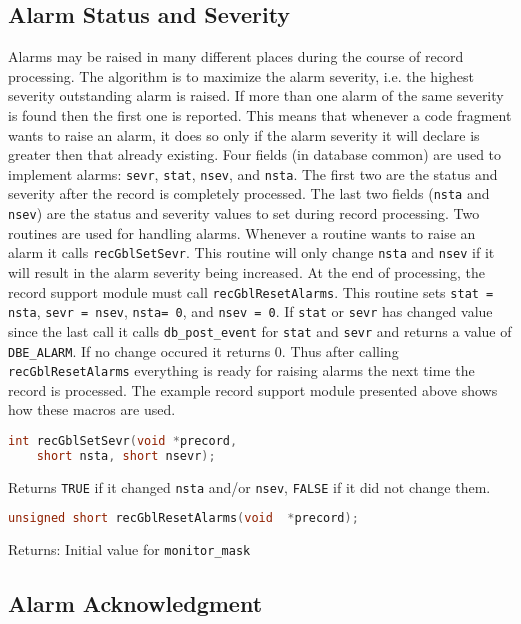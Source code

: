 \subsection{Alarm Status and Severity}

Alarms may be raised in many different places during the course of record processing.
The algorithm is to maximize the alarm severity, i.e. the highest severity outstanding alarm is raised.
If more than one alarm of the same severity is found then the first one is reported.
This means that whenever a code fragment wants to raise an alarm, it does so only if the alarm severity it will declare is greater then that already existing.
Four fields (in database common) are used to implement alarms:
\verb|sevr|, \verb|stat|, \verb|nsev|, and \verb|nsta|.
The first two are the status and severity after the record is completely processed.
The last two fields (\verb|nsta| and \verb|nsev|) are the status and severity values to set during record processing.
Two routines are used for handling alarms.
Whenever a routine wants to raise an alarm it calls \verb|recGblSetSevr|.
This routine will only change \verb|nsta| and \verb|nsev| if it will result in the alarm severity being increased.
At the end of processing, the record support module must call \verb|recGblResetAlarms|.
This routine sets \verb|stat = nsta|, \verb|sevr = nsev|, \verb|nsta= 0|, and \verb|nsev = 0|.
If \verb|stat| or \verb|sevr| has changed value since the last call it calls \verb|db_post_event| for \verb|stat| and \verb|sevr| and returns a value of \verb|DBE_ALARM|.
If no change occured it returns 0.
Thus after calling \verb|recGblResetAlarms| everything is ready for raising alarms the next time the record is processed.
The example record support module presented above shows how these macros are used.

\begin{lstlisting}[language=C]
int recGblSetSevr(void *precord,
    short nsta, short nsevr);
\end{lstlisting}

Returns \verb|TRUE| if it changed \verb|nsta| and/or \verb|nsev|, \verb|FALSE| if it did not change them.

\begin{lstlisting}[language=C]
unsigned short recGblResetAlarms(void  *precord);
\end{lstlisting}

Returns: Initial value for \verb|monitor_mask|

\subsection{Alarm Acknowledgment}

